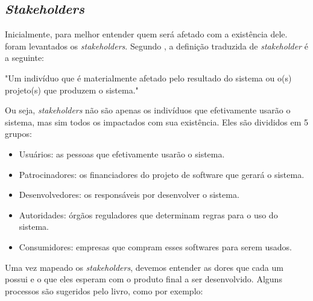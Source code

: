 \subsection{\textit{Stakeholders}}
Inicialmente, para melhor entender quem será afetado com a existência dele. foram levantados os \textit{stakeholders}. Segundo \cite{kurtbittnerianspence2002}, a definição traduzida de \textit{stakeholder} é a seguinte:

\begin{citacaoLonga}
"Um indivíduo que é materialmente afetado pelo resultado do
sistema ou o(s) projeto(s) que produzem o sistema."
\end{citacaoLonga}

Ou seja, \textit{stakeholders} não são apenas os indivíduos que efetivamente usarão o sistema, mas sim todos os impactados com sua existência. Eles são divididos em 5 grupos:

\begin{itemize}
    \item Usuários: as pessoas que efetivamente usarão o sistema.
    \item Patrocinadores: os financiadores do projeto de software que gerará o sistema.
    \item Desenvolvedores: os responsáveis por desenvolver o sistema.
    \item Autoridades: órgãos reguladores que determinam regras para o uso do sistema.
    \item Consumidores: empresas que compram esses softwares para serem usados.
\end{itemize}

Uma vez mapeado os \textit{stakeholders}, devemos entender as dores que cada um possui e o que eles esperam com o produto final a ser desenvolvido. Alguns processos são sugeridos pelo livro\cite{kurtbittnerianspence2002}, como por exemplo:

